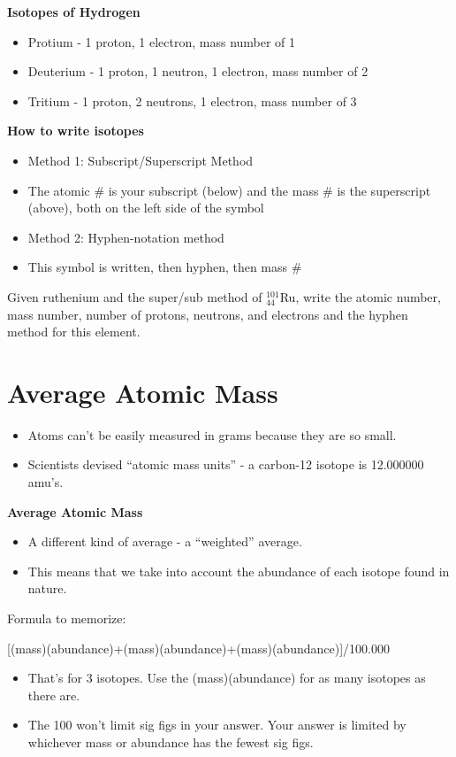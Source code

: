 \documentclass[../hchem.tex]{subfiles}
\begin{document}
\textbf{Isotopes of Hydrogen}
\begin{itemize}
    \item Protium - 1 proton, 1 electron, mass number of 1 
    \item Deuterium - 1 proton, 1 neutron, 1 electron, mass number of 2 
    \item Tritium - 1 proton, 2 neutrons, 1 electron, mass number of 3
\end{itemize}

\textbf{How to write isotopes}
\begin{itemize}
    \item Method 1: Subscript/Superscript Method 
    \item The atomic \# is your subscript (below) and the mass \# is the superscript (above), both on the left side of the symbol
    
    \item Method 2: Hyphen-notation method 
    \item This symbol is written, then hyphen, then mass \#
\end{itemize}

\ex Given ruthenium and the super/sub method of $^{101}_44$Ru, 
write the atomic number, mass number, number of protons, neutrons, and electrons and the hyphen method for this element.

\section{Average Atomic Mass}
\begin{itemize}
    \item Atoms can't be easily measured in grams because they are so small.
    \item Scientists devised ``atomic mass units'' - a carbon-12 isotope is 12.000000 amu's.
\end{itemize}

\textbf{Average Atomic Mass}
\begin{itemize}
    \item A different kind of average - a ``weighted'' average.
    \item This means that we take into account the abundance of each isotope found in nature.
\end{itemize}

Formula to memorize:
\begin{center}
    [(mass)(abundance)+(mass)(abundance)+(mass)(abundance)]/100.000
\end{center}
\begin{itemize}
    \item That's for 3 isotopes. Use the (mass)(abundance) for as many isotopes as there are.
    \item The 100 won't limit sig figs in your answer. Your answer is limited by whichever mass or abundance has the fewest sig figs.
\end{itemize}
\end{document}
